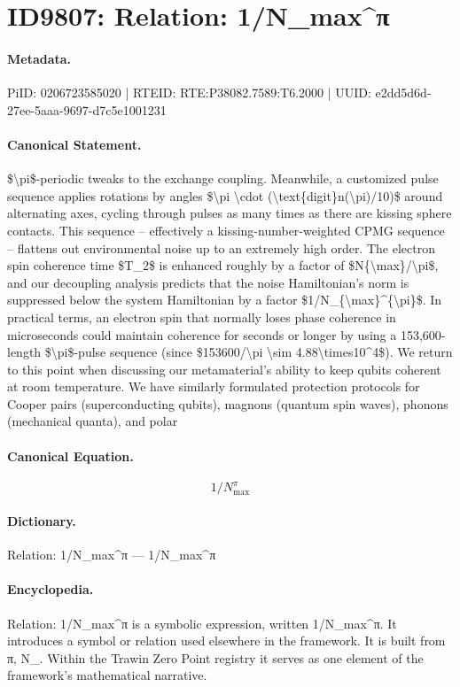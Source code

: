 \section*{ID9807: Relation: 1/N\_max\textasciicircum{}π}
\paragraph{Metadata.}
PiID: 0206723585020 | RTEID: RTE:P38082.7589:T6.2000 | UUID: e2dd5d6d-27ee-5aaa-9697-d7c5e1001231

\paragraph{Canonical Statement.}
\$\textbackslash{}pi\$-periodic tweaks to the exchange coupling. Meanwhile, a customized pulse sequence applies rotations by angles \$\textbackslash{}pi \textbackslash{}cdot (\textbackslash{}text\{digit\}n(\textbackslash{}pi)/10)\$ around alternating axes, cycling through pulses as many times as there are kissing sphere contacts. This sequence – effectively a kissing-number-weighted CPMG sequence – flattens out environmental noise up to an extremely high order. The electron spin coherence time \$T\_2\$ is enhanced roughly by a factor of \$N\{\textbackslash{}max\}/\textbackslash{}pi\$, and our decoupling analysis predicts that the noise Hamiltonian’s norm is suppressed below the system Hamiltonian by a factor \$1/N\_\{\textbackslash{}max\}\textasciicircum{}\{\textbackslash{}pi\}\$. In practical terms, an electron spin that normally loses phase coherence in microseconds could maintain coherence for seconds or longer by using a 153,600-length \$\textbackslash{}pi\$-pulse sequence (since \$153600/\textbackslash{}pi \textbackslash{}sim 4.88\textbackslash{}times10\textasciicircum{}4\$). We return to this point when discussing our metamaterial’s ability to keep qubits coherent at room temperature. We have similarly formulated protection protocols for Cooper pairs (superconducting qubits), magnons (quantum spin waves), phonons (mechanical quanta), and polar

\paragraph{Canonical Equation.}
\[
1/N_{\max}^{\pi}
\]

\paragraph{Dictionary.}
Relation: 1/N\_max\textasciicircum{}π — 1/N\_max\textasciicircum{}π

\paragraph{Encyclopedia.}
Relation: 1/N\_max\textasciicircum{}π is a symbolic expression, written 1/N\_max\textasciicircum{}π. It introduces a symbol or relation used elsewhere in the framework. It is built from π, N\_. Within the Trawin Zero Point registry it serves as one element of the framework's mathematical narrative.
